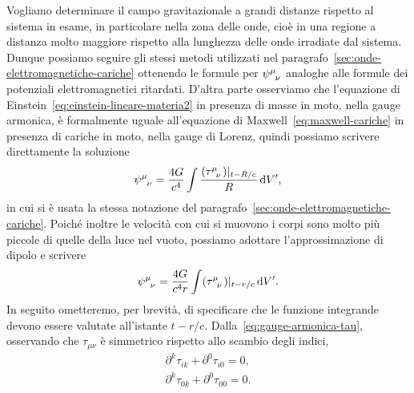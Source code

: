 Vogliamo determinare il campo gravitazionale a grandi distanze rispetto al
sistema in esame, in particolare nella zona delle onde,
cioè in una regione a distanza molto maggiore rispetto alla lunghezza delle onde
irradiate dal sistema.  Dunque possiamo seguire gli stessi metodi utilizzati nel
paragrafo~\ref{sec:onde-elettromagnetiche-cariche} ottenendo le formule per
$\tensor{\psi}{^{\mu}_{\nu}}$ analoghe alle formule dei potenziali
elettromagnetici ritardati.  D'altra parte osserviamo che l'equazione di
Einstein~\eqref{eq:einstein-lineare-materia2} in presenza di masse in moto,
nella gauge armonica, è formalmente uguale all'equazione di
Maxwell~\ref{eq:maxwell-cariche} in presenza di cariche in moto, nella gauge di
Lorenz, quindi possiamo scrivere direttamente la soluzione
\begin{equation}
  \tensor{\psi}{^{\mu}_{\nu}} = \frac{4G}{c^{4}}\int
  \frac{(\tensor{\tau}{^{\mu}_{\nu}})|_{t - R/c}}{R} \dd V',
\end{equation}
in cui si è usata la stessa notazione del
paragrafo~\ref{sec:onde-elettromagnetiche-cariche}.  Poiché inoltre le velocità
con cui si muovono i corpi sono molto più piccole di quelle della luce nel
vuoto, possiamo adottare l'approssimazione di dipolo e scrivere
\begin{equation}
  \label{eq:psi-mu-nu}
  \tensor{\psi}{^{\mu}_{\nu}} = \frac{4G}{c^{4}r} \int
  (\tensor{\tau}{^{\mu}_{\nu}})|_{t-r/c} \dd V'.
\end{equation}
In seguito ometteremo, per brevità, di specificare che le funzione integrande
devono essere valutate all'istante $t-r/c$.
Dalla~\eqref{eq:gauge-armonica-tau}, osservando che $\tau_{\mu\nu}$ è simmetrico
rispetto allo scambio degli indici,
\begin{subequations}
  \begin{align}
    \label{eq:baz1}
    \partial^{k}\tau_{ik} + \partial^{0}\tau_{i0} = 0, \\
    \label{eq:baz2}
    \partial^{k}\tau_{0k} + \partial^{0}\tau_{00} = 0.
  \end{align}
\end{subequations}
